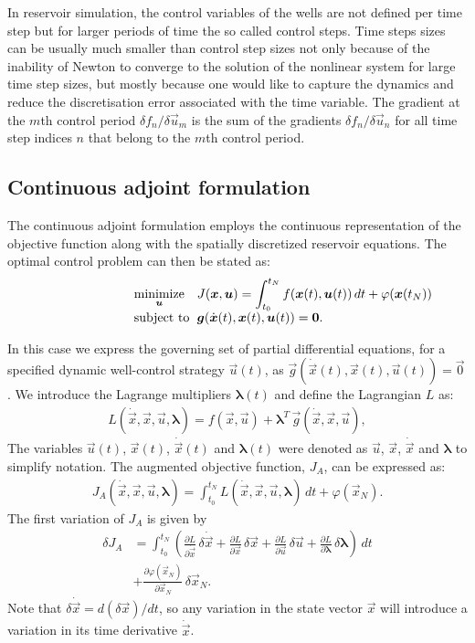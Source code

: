 \documentclass[twocolumn,numbook]{svjour3}          %
\makeatletter
\newcommand{\integral}[1]{\int_{t_0}^{t_N} {#1} \, dt}
\newcommand{\pder}[2]{\frac{\partial #1}{\partial #2}}
\def\u{{\vec u}}
\def\x{{\vec x}}
\def\p{{\vec{g}}}
\def\0{{\vec 0}}
\def\blambda{{\pmb{\lambda}}}%
\def\M{{\varphi}}
\def\F{f}
\def\myobj{J}
\def\minim{\mathop{\hbox{\rm minimize}}}
\def\minimize#1{{\displaystyle\minim_{#1}}}
\def\subject{\mbox{\rm subject to}}
\def\L{L}                    %
\def\problem#1#2#3#4{%
   {\begin{tabular*}{0.47\textwidth}
    {@{}l@{\extracolsep{\fill}}l@{\extracolsep{6pt}}l@{\extracolsep{\fill}}c@{}}
      #1 & $\minimize{#2}$ & $#3$ & $ $ \\[5pt]
         & $\subject$      & $#4$ & $ $
    \end{tabular*}}}
\makeatother
\begin{document}
In reservoir simulation, the control variables of the wells are not defined per time step but for 
larger periods of time the so called control steps. Time steps sizes can be usually much smaller than control
step sizes not only because of the inability of Newton to converge to the solution of the nonlinear system 
 for large time step sizes, but mostly because one would like to capture the 
dynamics and reduce the discretisation error associated with the time variable. 
The gradient at the $m$th control period $\delta f_n/\delta \u_m$ is the sum of
the gradients $\delta f_n/\delta \u_n$ for all time step indices $n$ that belong to the $m$th control period.


\subsection{Continuous adjoint formulation}
\label{section:continuousAdjoint}
The continuous adjoint formulation employs the continuous
representation of the objective function along with the spatially discretized reservoir equations. The optimal control problem can then be stated as:
\[
   \problem{}{\u}{\displaystyle \myobj(\x, \u) = \integral{ \F(\x(t), \u(t)) } + \M(\x(t_N))}
                 {\p(\dot\x(t), \x(t), \u(t) ) = \0.}
\]


In this case we express the governing set of partial differential
equations, for a specified dynamic well-control strategy $\u(t)$, as $\p(\dot{\x}(t), \x(t), \u(t) ) = \0$.  
We introduce the Lagrange multipliers $\blambda(t)$  and define the Lagrangian $\L$ as:
%
\begin{align}
  \label{eq:lagrangian}
  \L(\dot{\x}, \x, \u, \blambda) = \F(\x, \u) + \blambda^T \, \p(\dot{\x}, \x, \u ),
\end{align}
%
The
variables $\u(t)$, $\x(t)$, $\dot{\x}(t)$ and $\blambda(t)$ were denoted
as $\u$, $\x$, $\dot{\x}$ and $\blambda$ to simplify notation. The
augmented objective function, $\myobj_A$, can be expressed as:
%
\begin{align}
  \myobj_A(\dot{\x}, \x, \u, \blambda) = \integral{\L(\dot{\x}, \x, \u, \blambda)} + \M(\x_N).
\end{align}
%
The first variation of $\myobj_A$ is given by
%
\begin{align}
\label{eq:firstvariation}
  \delta \myobj_A
  &= \integral{
    \left (
    \pder{\L}{\dot{\x}} \, \delta \dot{\x}
  + \pder{\L}{\x} \, \delta \x
  + \pder{\L}{\u} \, \delta \u
  + \pder{\L}{\blambda} \, \delta \blambda \right ) }
  \nonumber \\
  &+ \pder{\M(\x_N)}{\x_N} \, \delta \x_N.
\end{align}
%
Note that $\delta \dot{\x} = d (\delta \x) / d t$, so any variation in
the state vector $\x$ will introduce a
variation in its time derivative $\dot{\x}$.
\end{document}

